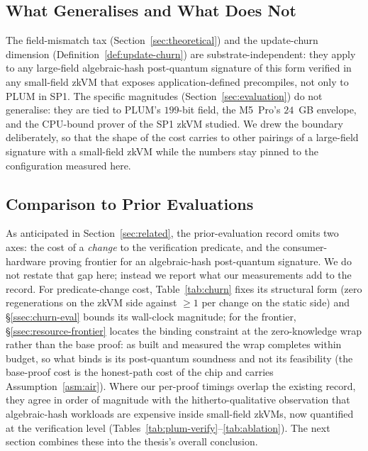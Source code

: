 \subsection{What Generalises and What Does Not}\label{ssec:generalise}
The field-mismatch tax (Section~\ref{sec:theoretical}) and the update-churn dimension (Definition~\ref{def:update-churn}) are substrate-independent: they apply to any large-field algebraic-hash post-quantum signature of this form verified in any small-field zkVM that exposes application-defined precompiles, not only to PLUM in SP1. The specific magnitudes (Section~\ref{sec:evaluation}) do not generalise: they are tied to PLUM's $199$-bit field, the M5~Pro's $24$~GB envelope, and the CPU-bound prover of the SP1 zkVM studied. We drew the boundary deliberately, so that the shape of the cost carries to other pairings of a large-field signature with a small-field zkVM while the numbers stay pinned to the configuration measured here.

\subsection{Comparison to Prior Evaluations}\label{ssec:prior-eval}
As anticipated in Section~\ref{sec:related}, the prior-evaluation record omits two axes: the cost of a \emph{change} to the verification predicate, and the consumer-hardware proving frontier for an algebraic-hash post-quantum signature. We do not restate that gap here; instead we report what our measurements add to the record. For predicate-change cost, Table~\ref{tab:churn} fixes its structural form (zero regenerations on the zkVM side against $\geq 1$ per change on the static side) and \S\ref{ssec:churn-eval} bounds its wall-clock magnitude; for the frontier, \S\ref{ssec:resource-frontier} locates the binding constraint at the zero-knowledge wrap rather than the base proof: as built and measured the wrap completes within budget, so what binds is its post-quantum soundness and not its feasibility (the base-proof cost is the honest-path cost of the chip and carries Assumption~\ref{asm:air}). Where our per-proof timings overlap the existing record, they agree in order of magnitude with the hitherto-qualitative observation that algebraic-hash workloads are expensive inside small-field zkVMs, now quantified at the verification level (Tables~\ref{tab:plum-verify}--\ref{tab:ablation}). The next section combines these into the thesis's overall conclusion.
